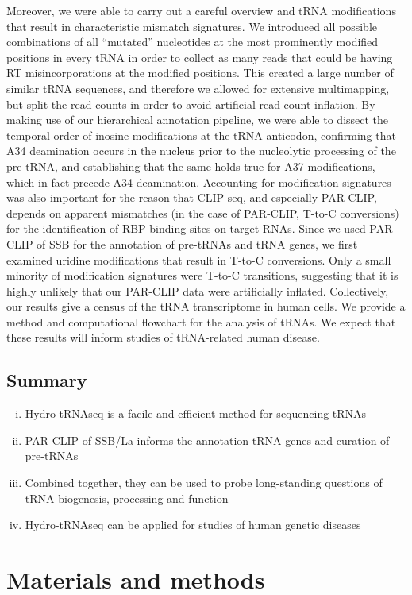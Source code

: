 \documentclass[12pt]{rockefeller}
\begin{document}
Moreover, we were able to carry out a careful overview and tRNA modifications that result in characteristic mismatch signatures. We introduced all possible combinations of all “mutated” nucleotides at the most prominently modified positions in every tRNA in order to collect as many reads that could be having RT misincorporations at the modified positions. This created a large number of similar tRNA sequences, and therefore we allowed for extensive multimapping, but split the read counts in order to avoid artificial read count inflation. By making use of our hierarchical annotation pipeline, we were able to dissect the temporal order of inosine modifications at the tRNA anticodon, confirming that A34 deamination occurs in the nucleus prior to the nucleolytic processing of the pre-tRNA, and establishing that the same holds true for A37 modifications, which in fact precede A34 deamination. 
	Accounting for modification signatures was also important for the reason that CLIP-seq, and especially PAR-CLIP, depends on apparent mismatches (in the case of PAR-CLIP, T-to-C conversions) for the identification of RBP binding sites on target RNAs. Since we used PAR-CLIP of SSB for the annotation of pre-tRNAs and tRNA genes, we first examined uridine modifications that result in T-to-C conversions. Only a small minority of modification signatures were T-to-C transitions, suggesting that it is highly unlikely that our PAR-CLIP data were artificially inflated. 
	Collectively, our results give a census of the tRNA transcriptome in human cells. We provide a method and computational flowchart for the analysis of tRNAs. We expect that these results will inform studies of tRNA-related human disease. 

\section{Summary}
\begin{enumerate}[i)]
\item Hydro-tRNAseq is a facile and efficient method for sequencing tRNAs
\item PAR-CLIP of SSB/La informs the annotation tRNA genes and curation of pre-tRNAs
\item Combined together, they can be used to probe long-standing questions of tRNA biogenesis, processing and function
\item Hydro-tRNAseq can be applied for studies of human genetic diseases
\end{enumerate}

\chapter{Materials and methods}
\end{document}
